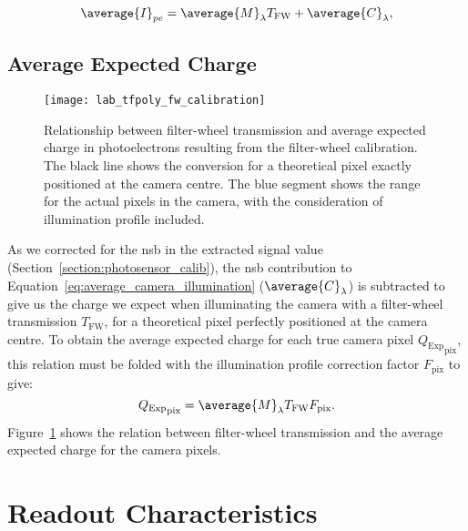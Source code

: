 \begin{equation} \label{eq:average_camera_illumination}
\average{I}_{pe} = \average{M}_\lambda T_\text{FW} + \average{C}_\lambda,
\end{equation}

\subsection{Average Expected Charge}

\begin{figure}
	\centering
    \texttt{[image: lab\_tfpoly\_fw\_calibration]} 
	\caption[Calibration from Filter-Wheel Transmission to Expected ]{Relationship between filter-wheel transmission and average expected charge in photoelectrons resulting from the filter-wheel calibration. The black line shows the conversion for a theoretical pixel exactly positioned at the camera centre. The blue segment shows the range for the actual pixels in the camera, with the consideration of illumination profile included.}
	\label{fig:fw_calibration}
\end{figure}

As we corrected for the \gls{nsb} in the extracted signal value (Section~\ref{section:photosensor_calib}), the \gls{nsb} contribution to Equation~\ref{eq:average_camera_illumination} ($\average{C}_\lambda$) is subtracted to give us the charge we expect when illuminating the camera with a filter-wheel transmission $T_\text{FW}$, for a theoretical pixel perfectly positioned at the camera centre. To obtain the average expected charge for each true camera pixel ${Q_\text{Exp}}_\text{pix}$, this relation must be folded with the illumination profile correction factor $F_\text{pix}$ to give:
\begin{equation} \label{eq:average_camera_illumination}
{Q_\text{Exp}}_\text{pix} = \average{M}_\lambda T_\text{FW}F_\text{pix}.
\end{equation}
Figure~\ref{fig:fw_calibration} shows the relation between filter-wheel transmission and the average expected charge for the camera pixels.

\section{Readout Characteristics} \label{section:readout_characteristics}


